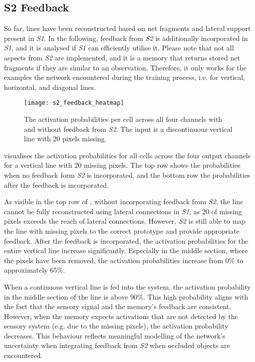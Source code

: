 \subsection{S2 Feedback}
So far, lines have been reconstructed based on net fragments and lateral support present in \emph{S1}.
In the following, feedback from \emph{S2} is additionally incorporated in \emph{S1}, and it is analysed if \emph{S1} can efficiently utilise it.
Please note that not all aspects from \emph{S2} are implemented, and it is a memory that returns stored net fragments if they are similar to an observation.
Therefore, it only works for the examples the network encountered during the training process, i.e. for vertical, horizontal, and diagonal lines.

\begin{figure}[h]
    \centering
    \texttt{[image: s2\_feedback\_heatmap]}
    \caption[Activation probabilities with/without \emph{S2} feedback]{The activation probabilities per cell across all four channels with and without feedback from \emph{S2}. The input is a discontinuous vertical line with $20$ pixels missing.}
\end{figure}
%
 visualises the activation probabilities for all cells across the four output channels for a vertical line with $20$ missing pixels.
The top row shows the probabilities when no feedback form \emph{S2} is incorporated, and the bottom row the probabilities after the feedback is incorporated.

As visible in the top row of , without incorporating feedback from \emph{S2}, the line cannot be fully reconstructed using lateral connections in \emph{S1}, as $20$ of missing pixels exceeds the reach of lateral connections. However, \emph{S2} is still able to map the line with missing pixels to the correct prototype and provide appropriate feedback. After the feedback is incorporated, the activation probabilities for the entire vertical line increase significantly. Especially in the middle section, where the pixels have been removed, the activation probabilities increase from $0\%$ to approximately $65\%$.

When a continuous vertical line is fed into the system, the activation probability in the middle section of the line is above $90\%$.
This high probability aligns with the fact that the sensory signal and the memory's feedback are consistent.
However, when the memory expects activations that are not detected by the sensory system (e.g. due to the missing pixels), the activation probability decreases. This behaviour reflects meaningful modelling of the network's uncertainty when integrating feedback from \emph{S2} when occluded objects are encountered.

